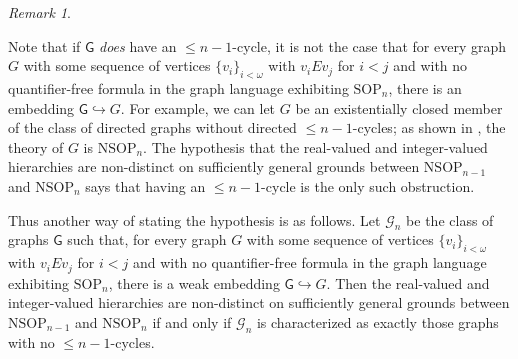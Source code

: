 \documentclass{amsart}
\theoremstyle{definition}
\theoremstyle{remark}
\newtheorem{remark}[theorem]{Remark}
\numberwithin{equation}{section}
\begin{document}
\begin{remark} \label{no n-1-cycles}

Note that if $\mathsf{G}$ \textit{does} have an $\leq n-1$-cycle, it is not the case that for every graph $G$ with some sequence of vertices $\{v_{i}\}_{i < \omega}$ with $v_{i} E v_{j}$ for $i < j$ and with no quantifier-free formula in the graph language exhibiting $\mathrm{SOP}_{n}$, there is an embedding $\mathsf{G} \hookrightarrow G$. For example, we can let $G$ be an existentially closed member of the class of directed graphs without directed $\leq n-1$-cycles; as shown in \cite{She95}, the theory of $G$ is $\mathrm{NSOP}_{n}$. The hypothesis that the real-valued and integer-valued hierarchies are non-distinct on sufficiently general grounds between $\mathrm{NSOP}_{n-1}$ and $\mathrm{NSOP}_{n}$ says that having an $\leq n-1$-cycle is the only such obstruction.

Thus another way of stating the hypothesis is as follows. Let $\mathcal{G}_{n}$ be the class of graphs $\mathsf{G}$ such that, for every graph $G$ with some sequence of vertices $\{v_{i}\}_{i < \omega}$ with $v_{i} E v_{j}$ for $i < j$ and with no quantifier-free formula in the graph language exhibiting $\mathrm{SOP}_{n}$, there is a weak embedding $\mathsf{G} \hookrightarrow G$. Then the real-valued and integer-valued hierarchies are non-distinct on sufficiently general grounds between $\mathrm{NSOP}_{n-1}$ and $\mathrm{NSOP}_{n}$ if and only if $\mathcal{G}_{n}$ is characterized as exactly those graphs with no $\leq n-1$-cycles.

\end{remark}
\end{document}
